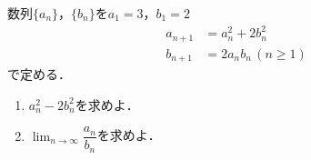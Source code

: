 \documentclass[../../main.tex]{subfiles}
\begin{document}
数列$\{a_n\}$，$\{b_n\}$を$a_1=3$，$b_1=2$
\begin{align*}
  a_{n+1} & =a_n^2+2b_n^2       \\
  b_{n+1} & =2a_nb_n\, (n\ge 1)
\end{align*}
で定める．

\begin{enumerate}
  \item $a_n^2-2b_n^2$を求めよ．
  \item ${\displaystyle \lim_{n\to\infty}}\dfrac{a_n}{b_n}$を求めよ．
\end{enumerate}
\end{document}
